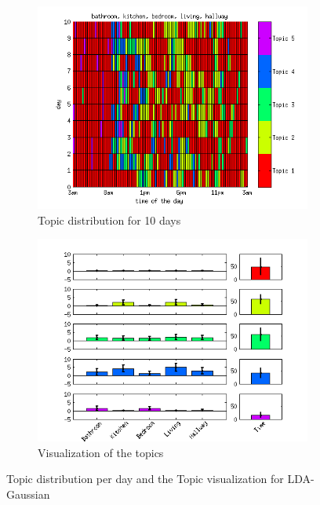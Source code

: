 \documentclass[a4paper,fleqn]{article}
\begin{document}
\begin{figure}[h!]
 \centering
 \begin{subfigure}[b]{0.45\linewidth}
  \centering
  \includegraphics[width=\textwidth]{Pictures/TopDayTS96k5Gaus.png}
  \caption{Topic distribution for 10 days}
 \end{subfigure}
 \begin{subfigure}[b]{0.45\linewidth}
  \centering
  \includegraphics[width=\textwidth]{Pictures/TopVisuTS96k5Gaus.png}
  \caption{Visualization of the topics}
  \label{fig:GausTopVisu96}
 \end{subfigure}
 \caption{Topic distribution per day and the Topic visualization for LDA-Gaussian}
 \label{fig:Gaus96}
\end{figure}
\end{document}
